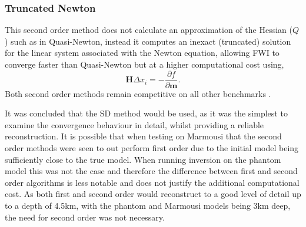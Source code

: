 \subsubsection{Truncated Newton}
This second order method does not calculate an approximation of the Hessian ($Q$) such as in Quasi-Newton, instead it computes an inexact (truncated) solution for the linear system associated with the Newton equation, allowing FWI to converge faster than Quasi-Newton but at a higher computational cost using, 
\begin{equation}
\textbf{H} \Delta x_{i} = - \frac{\partial f}{\partial\textbf{m} }.
\end{equation}
Both second order methods remain competitive on all other benchmarks \citep{castellanos2015fast}. 

It was concluded that the SD method would be used, as it was the simplest to examine the convergence behaviour in detail, whilst providing a reliable reconstruction. It is possible that when testing on Marmousi that the second order methods were seen to out perform first order due to the initial model being sufficiently close to the true model. When running inversion on the phantom model this was not the case and therefore the difference between first and second order algorithms is less notable and does not justify the additional computational cost. As both first and second order would reconstruct to a good level of detail up to a depth of 4.5km, with the phantom and Marmousi models being 3km deep, the need for second order was not necessary. \par


